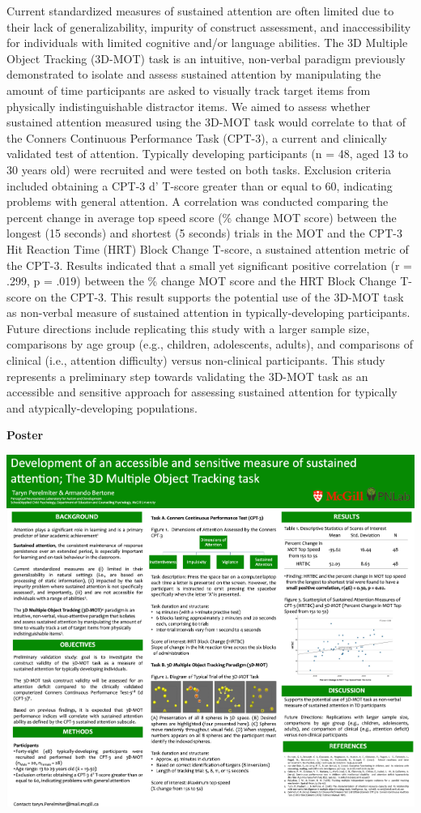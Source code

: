 \documentclass[
]{book}
\begin{document}
Current standardized measures of sustained attention are often limited due to their lack of generalizability, impurity of construct assessment, and inaccessibility for individuals with limited cognitive and/or language abilities. The 3D Multiple Object Tracking (3D-MOT) task is an intuitive, non-verbal paradigm previously demonstrated to isolate and assess sustained attention by manipulating the amount of time participants are asked to visually track target items from physically indistinguishable distractor items. We aimed to assess whether sustained attention measured using the 3D-MOT task would correlate to that of the Conners Continuous Performance Task (CPT-3), a current and clinically validated test of attention. Typically developing participants (n = 48, aged 13 to 30 years old) were recruited and were tested on both tasks. Exclusion criteria included obtaining a CPT-3 d' T-score greater than or equal to 60, indicating problems with general attention. A correlation was conducted comparing the percent change in average top speed score (\% change MOT score) between the longest (15 seconds) and shortest (5 seconds) trials in the MOT and the CPT-3 Hit Reaction Time (HRT) Block Change T-score, a sustained attention metric of the CPT-3. Results indicated that a small yet significant positive correlation (r = .299, p = .019) between the \% change MOT score and the HRT Block Change T-score on the CPT-3. This result supports the potential use of the 3D-MOT task as non-verbal measure of sustained attention in typically-developing participants. Future directions include replicating this study with a larger sample size, comparisons by age group (e.g., children, adolescents, adults), and comparisons of clinical (i.e., attention difficulty) versus non-clinical participants. This study represents a preliminary step towards validating the 3D-MOT task as an accessible and sensitive approach for assessing sustained attention for typically and atypically-developing populations.

\textbf{Poster}

\includegraphics{Content/TA.png}
\end{document}
